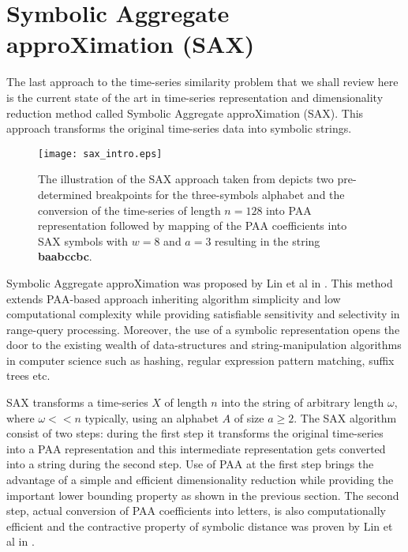 \section{Symbolic Aggregate approXimation (SAX)}
The last approach to the time-series similarity problem that we shall review here is the current state of the art in time-series representation and dimensionality reduction method called Symbolic Aggregate approXimation (SAX). This approach transforms the original time-series data into symbolic strings. 

\begin{figure}[tbp]
   \centering
   \texttt{[image: sax\_intro.eps]}
   \caption{The illustration of the SAX approach taken from \cite{citeulike:2821475} depicts two pre-determined breakpoints for the three-symbols alphabet and the conversion of the time-series of length $n=128$ into PAA representation followed by mapping of the PAA coefficients into SAX symbols with $w=8$ and $a=3$ resulting in the string \textbf{baabccbc}.}
   \label{fig:sax_intro}
\end{figure}

Symbolic Aggregate approXimation was proposed by Lin et al in \cite{citeulike:2821475}. This method extends PAA-based approach inheriting algorithm simplicity and low computational complexity while providing satisfiable sensitivity and selectivity in range-query processing. Moreover, the use of a symbolic representation opens the door to the existing wealth of data-structures and string-manipulation algorithms in computer science such as hashing, regular expression pattern matching, suffix trees etc.

SAX transforms a time-series $X$ of length $n$ into the string of arbitrary length $\omega$, where $\omega << n$ typically, using an alphabet $A$ of size $ a \geq 2$. The SAX algorithm consist of two steps: during the first step it transforms the original time-series into a PAA representation and this intermediate representation gets converted into a string during the second step. Use of PAA at the first step brings the advantage of a simple and efficient dimensionality reduction while providing the important lower bounding property as shown in the previous section. The second step, actual conversion of PAA coefficients into letters, is also computationally efficient and the contractive property of symbolic distance was proven by Lin et al in \cite{citeulike:532335}.

